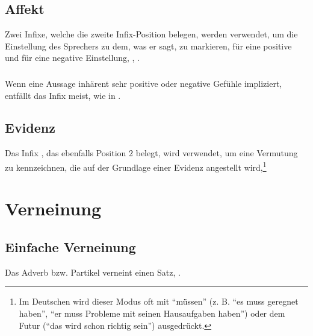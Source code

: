\subsection{Affekt} Zwei Infixe, welche die zweite Infix-Position belegen, werden verwendet, um die Einstellung des Sprechers zu dem, was er sagt, zu markieren,  für eine positive und  für eine negative Einstellung,  ,  . 

\subsubsection{} Wenn eine Aussage inhärent sehr positive oder negative Gefühle impliziert, entfällt das Infix meist, wie in  .

\subsection{Evidenz} Das Infix , das ebenfalls Position 2 belegt, wird verwendet, um eine Vermutung zu kennzeichnen, die auf der Grundlage einer Evidenz angestellt wird,\footnote{Im Deutschen wird dieser Modus oft mit ``müssen'' (z. B. ``es muss geregnet haben'', ``er muss Probleme mit seinen Hausaufgaben haben'') oder dem Futur (``das wird schon richtig sein'') ausgedrückt.}   


\section{Verneinung}

\subsection{Einfache Verneinung} Das Adverb bzw. Partikel  verneint einen Satz,  . 


